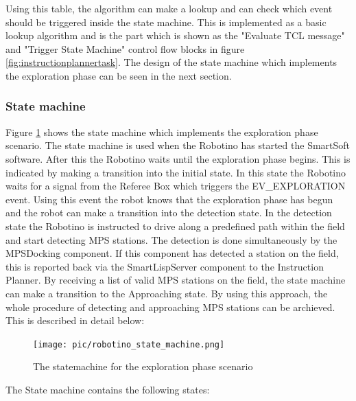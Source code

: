 \bigskip

Using this table, the algorithm can make a lookup and can check which event should be triggered inside the state machine. This is implemented as a basic lookup algorithm and is the part  which is shown as the "Evaluate TCL message" and "Trigger State Machine" control flow blocks in figure \ref{fig:instructionplannertask}. The design of the state machine which implements the exploration phase can be seen in the next section. 

\newpage  

\subsubsection{State machine}
\label{sec:state_machine}

Figure \ref{fig:statemachine} shows the state machine which implements the exploration phase scenario. The state machine is used when the Robotino has started the SmartSoft software. After this the Robotino waits until the exploration phase begins. This is indicated by making a transition into the initial state. In this state the Robotino waits for a signal from the Referee Box which triggers the EV\_EXPLORATION event. Using this event the robot knows that the exploration phase has begun and the robot can make a transition into the detection state. In the detection state the Robotino is instructed to drive along a predefined path within the field and start detecting MPS stations. The detection is done simultaneously by the MPSDocking component. If this component has detected a station on the field, this is reported back via the SmartLispServer component to the Instruction Planner. By receiving a list of valid MPS stations on the field, the state machine can make a transition to the Approaching state. By using this approach, the whole procedure of detecting and approaching MPS stations can be archieved. This is described in detail below: \\


\begin{figure}[h]
\centering
\texttt{[image: pic/robotino\_state\_machine.png]}
\caption{The statemachine for the exploration phase scenario}
\label{fig:statemachine}
\end{figure}

\newpage

The State machine contains the following states:

